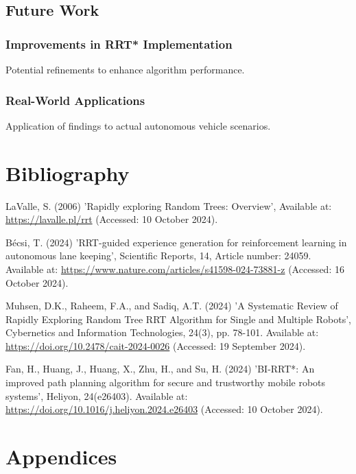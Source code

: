 \documentclass[a4paper,11pt]{report}
\begin{document}
\section{Future Work}
\subsection{Improvements in RRT* Implementation}
Potential refinements to enhance algorithm performance.

\subsection{Real-World Applications}
Application of findings to actual autonomous vehicle scenarios.

\newpage

\chapter{Bibliography}

\begin{thebibliography}{4}

     LaValle, S. (2006) 'Rapidly exploring Random Trees: Overview', Available at: \url{https://lavalle.pl/rrt} (Accessed: 10 October 2024).
    
     Bécsi, T. (2024) 'RRT-guided experience generation for reinforcement learning in autonomous lane keeping', Scientific Reports, 14, Article number: 24059. Available at: \url{https://www.nature.com/articles/s41598-024-73881-z} (Accessed: 16 October 2024).
    
     Muhsen, D.K., Raheem, F.A., and Sadiq, A.T. (2024) 'A Systematic Review of Rapidly Exploring Random Tree RRT Algorithm for Single and Multiple Robots', Cybernetics and Information Technologies, 24(3), pp. 78-101. Available at: \url{https://doi.org/10.2478/cait-2024-0026} (Accessed: 19 September 2024).
    
     Fan, H., Huang, J., Huang, X., Zhu, H., and Su, H. (2024) 'BI-RRT*: An improved path planning algorithm for secure and trustworthy mobile robots systems', Heliyon, 24(e26403). Available at: \url{https://doi.org/10.1016/j.heliyon.2024.e26403} (Accessed: 10 October 2024).
    
\end{thebibliography}

\newpage
 
\chapter{Appendices}
\end{document}
